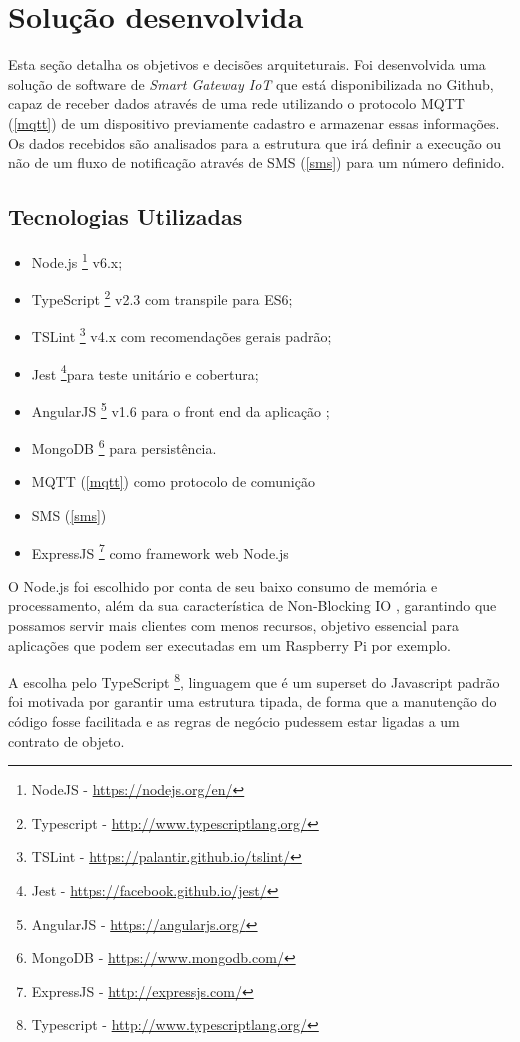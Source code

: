 \section{Solução desenvolvida}
\label{sec:iotGateway}

Esta seção detalha os objetivos e decisões arquiteturais. Foi desenvolvida uma solução de software de \textit{Smart Gateway IoT} que está disponibilizada no Github, capaz de receber dados através de uma rede utilizando o protocolo MQTT	(\ref{mqtt}) de um dispositivo previamente cadastro e armazenar essas informações. Os dados recebidos são analisados para a estrutura que irá definir a execução ou não de um fluxo de notificação através de SMS (\ref{sms}) para um número definido.

\subsection{Tecnologias Utilizadas} 
\begin{itemize}
	\item Node.js \footnote{NodeJS - \url{https://nodejs.org/en/}} v6.x;
	\item TypeScript \footnote{Typescript - \url{http://www.typescriptlang.org/}} v2.3 com transpile para ES6;
	\item TSLint \footnote{TSLint - \url{https://palantir.github.io/tslint/}} v4.x com recomendações gerais padrão;
	\item Jest \footnote{Jest - \url{https://facebook.github.io/jest/}}para teste unitário e cobertura;
	\item AngularJS \footnote{AngularJS - \url{https://angularjs.org/}} v1.6 para o front end da aplicação ;
	\item MongoDB \footnote{MongoDB - \url{https://www.mongodb.com/}} para persistência.
	\item MQTT (\ref{mqtt}) como protocolo de comunição
	\item SMS (\ref{sms}) 
	\item ExpressJS \footnote{ExpressJS - \url{http://expressjs.com/}} como framework web Node.js 
\end{itemize}

O Node.js foi escolhido por conta de seu baixo consumo de memória e processamento, além da sua característica de Non-Blocking IO \cite{NodeJSNonBlockingIO}, garantindo que possamos servir mais clientes com menos recursos, objetivo essencial para aplicações que podem ser executadas em um Raspberry Pi por exemplo.

A escolha pelo TypeScript \footnote{Typescript - \url{http://www.typescriptlang.org/}}, linguagem que é um superset do Javascript padrão foi motivada por garantir uma estrutura tipada, de forma que a manutenção do código fosse facilitada e as regras de negócio pudessem estar ligadas a um contrato de objeto.

